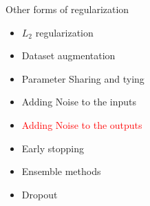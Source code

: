 \begin{frame}
\end{frame}

\begin{frame}
	\vspace{4em}
	\begin{overlayarea}{\textwidth}{\textheight}
		\begin{block}{Other forms of regularization}
			\begin{itemize}
				\item $L_2$ regularization
				\item Dataset augmentation
				\item Parameter Sharing and tying
				\item Adding Noise to the inputs
				\item \textcolor<1->{red}{Adding Noise to the outputs}
				\item Early stopping
				\item Ensemble methods
				\item Dropout
			\end{itemize}
		\end{block}
	\end{overlayarea}
\end{frame}
			
